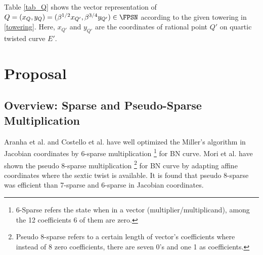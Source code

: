Table \ref{tab_Q} shows the vector representation of $Q = (x_{Q},y_Q) = (\beta^{1/2}x_{Q'},\beta^{3/4}y_{Q'}) \in \FPSN$ according to the given towering in \eqref{towering}. Here, $x_{Q'}$ and $y_{Q'}$ are the coordinates of rational point $Q'$ on quartic twisted curve $E'$. 
\renewcommand{\baselinestretch}{1.5}
\begin{table*}[t]
\caption{Vector representation of $Q = (x_Q,y_Q) \in \g2 \subset E(\mathbb{F}_{p^{16}})$}
\label{tab_Q}
\centering
{}
\end{table*}
\renewcommand{\baselinestretch}{1.0}
\section{Proposal}
\subsection{Overview: Sparse and Pseudo-Sparse Multiplication}
Aranha et al. \cite[Section 4]{EC:AKLGL11} and Costello et al. \cite{PKC:CosLanNae10} have  well optimized the Miller's algorithm in Jacobian coordinates by 6-sparse multiplication \footnote{\label{6sparse}{6-Sparse refers the state when in a vector (multiplier/multiplicand), among the 12 coefficients 6 of them are zero.}} for BN curve. 
Mori et al. \cite{PAIRING:MANS13} have  shown the pseudo  8-sparse multiplication \footnote{\label{pseudo8sparse}{Pseudo 8-sparse refers to a certain length of vector's coefficients where instead of 8 zero coefficients, there are seven  0's and one 1 as coefficients.}} for BN curve by adapting affine coordinates where the sextic twist is available. 
It is found that pseudo 8-sparse was efficient than 7-sparse and 6-sparse in Jacobian coordinates. 

